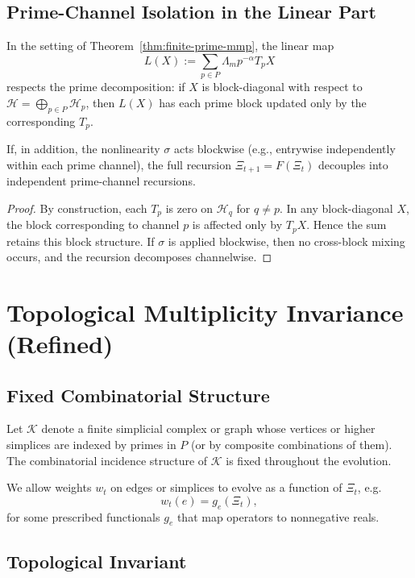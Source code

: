 \documentclass[12pt]{article}
\begin{document}
\subsection{Prime-Channel Isolation in the Linear Part}

\begin{corollary}
In the setting of Theorem~\ref{thm:finite-prime-mmp}, the linear map
\[
  L(X) := \sum_{p\in P} \Lambda_m p^{-\alpha} T_p X
\]
respects the prime decomposition: if \(X\) is block-diagonal with respect to \(\mathcal{H}=\bigoplus_{p\in P}\mathcal{H}_p\), then \(L(X)\) has each prime block updated only by the corresponding \(T_p\).

If, in addition, the nonlinearity \(\sigma\) acts blockwise (e.g., entrywise independently within each prime channel), the full recursion \(\Xi_{t+1}=F(\Xi_t)\) decouples into independent prime-channel recursions.
\end{corollary}

\begin{proof}
By construction, each \(T_p\) is zero on \(\mathcal{H}_q\) for \(q\neq p\). In any block-diagonal \(X\), the block corresponding to channel \(p\) is affected only by \(T_p X\). Hence the sum retains this block structure. If \(\sigma\) is applied blockwise, then no cross-block mixing occurs, and the recursion decomposes channelwise.
\end{proof}

\newpage

\section{Topological Multiplicity Invariance (Refined)}

\subsection{Fixed Combinatorial Structure}

Let \(\mathcal{K}\) denote a finite simplicial complex or graph whose vertices or higher simplices are indexed by primes in \(P\) (or by composite combinations of them). The combinatorial incidence structure of \(\mathcal{K}\) is fixed throughout the evolution.

We allow weights \(w_t\) on edges or simplices to evolve as a function of \(\Xi_t\), e.g.
\[
  w_t(e) = g_e(\Xi_t),
\]
for some prescribed functionals \(g_e\) that map operators to nonnegative reals.

\subsection{Topological Invariant}
\end{document}
